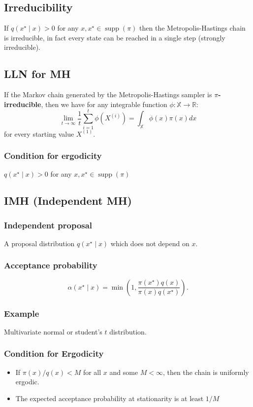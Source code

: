 \documentclass{article}
\begin{document}
\subsection{Irreducibility}
If $q\left(x^{\star} \mid x\right)>0$ for any $x, x^{\star} \in \operatorname{supp}(\pi)$ then the Metropolis-Hastings chain is irreducible, in fact every state can be reached in a single step (strongly irreducible).

\subsection{LLN for MH}
If the Markov chain generated by the Metropolis-Hastings sampler is \textbf{$\pi$-irreducible}, then we have for any integrable function $\phi: \mathbb{X} \rightarrow \mathbb{R}:$
$$
\lim _{t \rightarrow \infty} \frac{1}{t} \sum_{i=1}^t \phi\left(X^{(i)}\right)=\int_{\mathbb{X}} \phi(x) \pi(x) d x
$$
for every starting value $X^{(1)}$.

\subsubsection{Condition for ergodicity}
$q\left(x^{\star} \mid x\right)>0$ for any $x, x^{\star} \in \operatorname{supp}(\pi)$ 

\subsection{IMH (Independent MH)}
\subsubsection{Independent proposal} 
A proposal distribution $q\left(x^{\star} \mid x\right)$ which does not depend on $x$.

\subsubsection{Acceptance probability }
$$
\alpha\left(x^{\star} \mid x\right)=\min \left(1, \frac{\pi\left(x^{\star}\right) q(x)}{\pi(x) q\left(x^{\star}\right)}\right) .
$$
\subsubsection{Example}
Multivariate normal or student's $t$ distribution.

\subsubsection{Condition for Ergodicity}
\begin{itemize}
    \item If $\pi(x) / q(x)<M$ for all $x$ and some $M<\infty$, then the chain is uniformly ergodic.
    \item The expected acceptance probability at stationarity is at least $1 / M$

\end{itemize}
\end{document}
